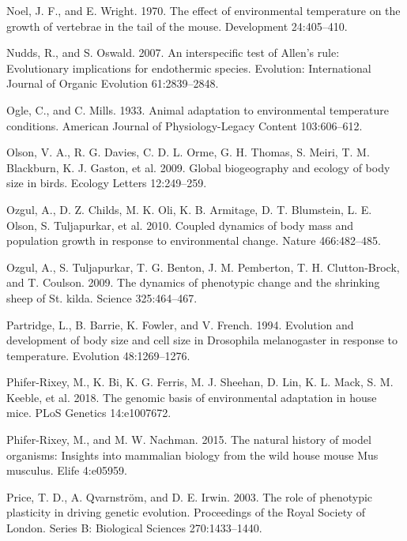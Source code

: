 \documentclass[]{article}
\begin{document}
\leavevmode\hypertarget{ref-Noel1970}{}%
Noel, J. F., and E. Wright. 1970. The effect of environmental
temperature on the growth of vertebrae in the tail of the mouse.
Development 24:405--410.

\leavevmode\hypertarget{ref-Nudds2007}{}%
Nudds, R., and S. Oswald. 2007. An interspecific test of Allen's rule:
Evolutionary implications for endothermic species. Evolution:
International Journal of Organic Evolution 61:2839--2848.

\leavevmode\hypertarget{ref-Ogle1933}{}%
Ogle, C., and C. Mills. 1933. Animal adaptation to environmental
temperature conditions. American Journal of Physiology-Legacy Content
103:606--612.

\leavevmode\hypertarget{ref-Olson2009}{}%
Olson, V. A., R. G. Davies, C. D. L. Orme, G. H. Thomas, S. Meiri, T. M.
Blackburn, K. J. Gaston, et al. 2009. Global biogeography and ecology of
body size in birds. Ecology Letters 12:249--259.

\leavevmode\hypertarget{ref-Ozgul2010}{}%
Ozgul, A., D. Z. Childs, M. K. Oli, K. B. Armitage, D. T. Blumstein, L.
E. Olson, S. Tuljapurkar, et al. 2010. Coupled dynamics of body mass and
population growth in response to environmental change. Nature
466:482--485.

\leavevmode\hypertarget{ref-Ozgul2009}{}%
Ozgul, A., S. Tuljapurkar, T. G. Benton, J. M. Pemberton, T. H.
Clutton-Brock, and T. Coulson. 2009. The dynamics of phenotypic change
and the shrinking sheep of St. kilda. Science 325:464--467.

\leavevmode\hypertarget{ref-Partridge1994}{}%
Partridge, L., B. Barrie, K. Fowler, and V. French. 1994. Evolution and
development of body size and cell size in Drosophila melanogaster in
response to temperature. Evolution 48:1269--1276.

\leavevmode\hypertarget{ref-Phifer-Rixey2018}{}%
Phifer-Rixey, M., K. Bi, K. G. Ferris, M. J. Sheehan, D. Lin, K. L.
Mack, S. M. Keeble, et al. 2018. The genomic basis of environmental
adaptation in house mice. PLoS Genetics 14:e1007672.

\leavevmode\hypertarget{ref-Phifer-Rixey2015}{}%
Phifer-Rixey, M., and M. W. Nachman. 2015. The natural history of model
organisms: Insights into mammalian biology from the wild house mouse Mus
musculus. Elife 4:e05959.

\leavevmode\hypertarget{ref-Price2003}{}%
Price, T. D., A. Qvarnström, and D. E. Irwin. 2003. The role of
phenotypic plasticity in driving genetic evolution. Proceedings of the
Royal Society of London. Series B: Biological Sciences 270:1433--1440.
\end{document}
